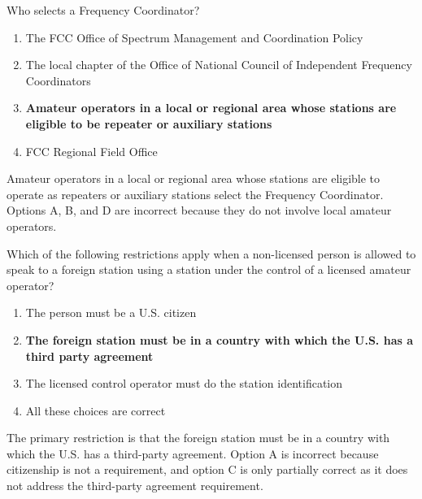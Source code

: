 \begin{tcolorbox}[colback=gray!10!white,colframe=black!75!black,title={T1A09}]
    Who selects a Frequency Coordinator?
    \begin{enumerate}[label=\Alph*),noitemsep]
        \item The FCC Office of Spectrum Management and Coordination Policy
        \item The local chapter of the Office of National Council of Independent Frequency Coordinators
        \item \textbf{Amateur operators in a local or regional area whose stations are eligible to be repeater or auxiliary stations}
        \item FCC Regional Field Office
    \end{enumerate}
\end{tcolorbox}
Amateur operators in a local or regional area whose stations are eligible to operate as repeaters or auxiliary stations select the Frequency Coordinator. Options A, B, and D are incorrect because they do not involve local amateur operators.


\begin{tcolorbox}[colback=gray!10!white,colframe=black!75!black,title={T1F07}]
    Which of the following restrictions apply when a non-licensed person is allowed to speak to a foreign station using a station under the control of a licensed amateur operator?
    \begin{enumerate}[label=\Alph*),noitemsep]
        \item The person must be a U.S. citizen
        \item \textbf{The foreign station must be in a country with which the U.S. has a third party agreement}
        \item The licensed control operator must do the station identification
        \item All these choices are correct
    \end{enumerate}
\end{tcolorbox}
The primary restriction is that the foreign station must be in a country with which the U.S. has a third-party agreement. Option A is incorrect because citizenship is not a requirement, and option C is only partially correct as it does not address the third-party agreement requirement.


